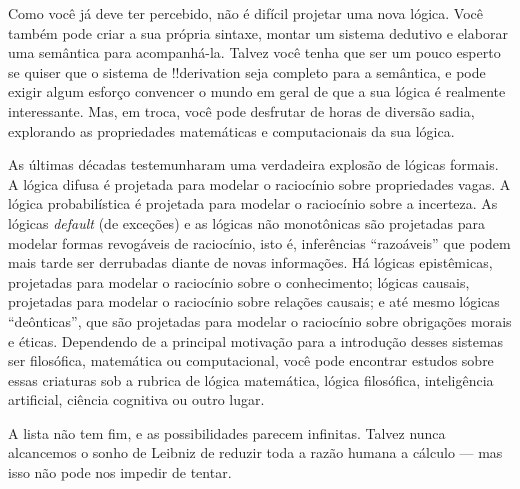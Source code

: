 \documentclass[../../../include/open-logic-section]{subfiles}
\begin{document}


Como você já deve ter percebido, não é difícil projetar uma nova lógica.
Você também pode criar a sua própria sintaxe, montar um sistema dedutivo e
elaborar uma semântica para acompanhá-la. Talvez você tenha que ser um pouco
esperto se quiser que o sistema de !!{derivation} seja completo para a
semântica, e pode exigir algum esforço convencer o mundo em geral de que a
sua lógica é realmente interessante. Mas, em troca, você pode desfrutar de
horas de diversão sadia, explorando as propriedades matemáticas e
computacionais da sua lógica.

As últimas décadas testemunharam uma verdadeira explosão de lógicas formais.
A lógica difusa é projetada para modelar o raciocínio sobre propriedades
vagas. A lógica probabilística é projetada para modelar o raciocínio sobre a
incerteza. As lógicas \emph{default} (de exceções) e as lógicas não
monotônicas são projetadas para modelar formas revogáveis de raciocínio,
isto é, inferências ``razoáveis'' que podem mais tarde ser derrubadas diante
de novas informações. Há lógicas epistêmicas, projetadas para modelar o
raciocínio sobre o conhecimento; lógicas causais, projetadas para modelar o
raciocínio sobre relações causais; e até mesmo lógicas ``deônticas'', que
são projetadas para modelar o raciocínio sobre obrigações morais e éticas.
Dependendo de a principal motivação para a introdução desses sistemas ser
filosófica, matemática ou computacional, você pode encontrar estudos sobre
essas criaturas sob a rubrica de lógica matemática, lógica filosófica,
inteligência artificial, ciência cognitiva ou outro lugar.

A lista não tem fim, e as possibilidades parecem infinitas. Talvez nunca
alcancemos o sonho de Leibniz de reduzir toda a razão humana a cálculo ---
mas isso não pode nos impedir de tentar.
\end{document}
